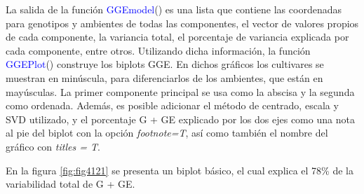 La salida de la función \textcolor{blue}{GGEmodel}() es una lista que contiene las coordenadas para genotipos y ambientes de todas las componentes, el vector de valores propios de cada componente, la variancia total, el porcentaje de variancia explicada por cada componente, entre otros. Utilizando dicha información, la función \textcolor{blue}{GGEPlot}() construye los biplots GGE. En dichos gráficos los cultivares se muestran en minúscula, para diferenciarlos de los ambientes, que están en mayúsculas. La primer componente principal se usa como la abscisa y la segunda como ordenada. Además, es posible adicionar el método de centrado, escala y SVD utilizado, y el porcentaje G + GE explicado por los dos ejes como una nota al pie del biplot con la opción \emph{footnote=T}, así como también el nombre del gráfico con \emph{titles = T}.


En la figura \ref{fig:fig4121} se presenta un biplot básico, el cual explica el 78\% de la variabilidad total de G + GE. 


